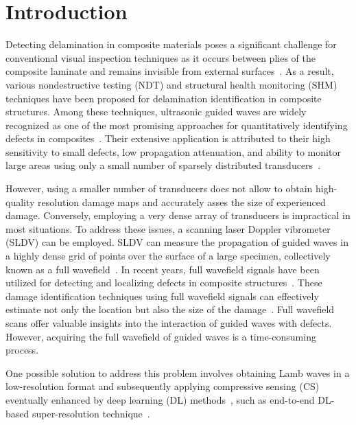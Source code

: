 \maketitle
\section{Introduction}

Detecting delamination in composite materials poses a significant challenge for conventional visual inspection techniques as it occurs between plies of the composite laminate and remains invisible from external surfaces~\cite{staszewski2009health, tuo2019damage}. 
As a result, various nondestructive testing (NDT) and structural health 
monitoring (SHM) techniques have been proposed for delamination identification 
in composite structures. 
Among these techniques, ultrasonic guided waves are widely recognized as one of 
the most promising approaches for quantitatively identifying defects in 
composites~\cite{tian2015delamination, munian2018lamb}. 
Their extensive application is attributed to their high sensitivity to small defects, low propagation attenuation, and ability to monitor large areas using only a small number of sparsely distributed transducers~\cite{Barthorpe2020, Ihn2008, Cantero-Chinchilla2020}.

However, using a smaller number of transducers does not allow to obtain 
high-quality resolution damage maps and accurately asses the size of 
experienced damage. 
Conversely, employing a very dense array of transducers is impractical in most 
situations. To address these issues, a scanning laser Doppler vibrometer (SLDV) 
can be employed. 
SLDV can measure the propagation of guided waves in a highly dense grid of points over the surface of a large specimen, collectively known as a full wavefield~\cite{Radzienski2019a}. 
In recent years, full wavefield signals have been utilized for detecting and localizing defects in composite structures~\cite{Radzienski2019a, Girolamo2018a, kudela2018impact, rogge2013characterization}. 
These damage identification techniques using full wavefield signals can 
effectively estimate not only the location but also the size of the 
damage~\cite{Girolamo2018a, kudela2018impact}. 
Full wavefield scans offer valuable insights into the interaction of guided waves with defects. However, acquiring the full wavefield of guided waves is a time-consuming process.

One possible solution to address this problem involves obtaining Lamb waves in 
a low-resolution format and subsequently applying compressive sensing (CS) 
eventually enhanced by deep learning (DL) methods~\cite{esfandabadideep}, such 
as end-to-end DL-based super-resolution technique~\cite{ijjeh2023deep}. 

